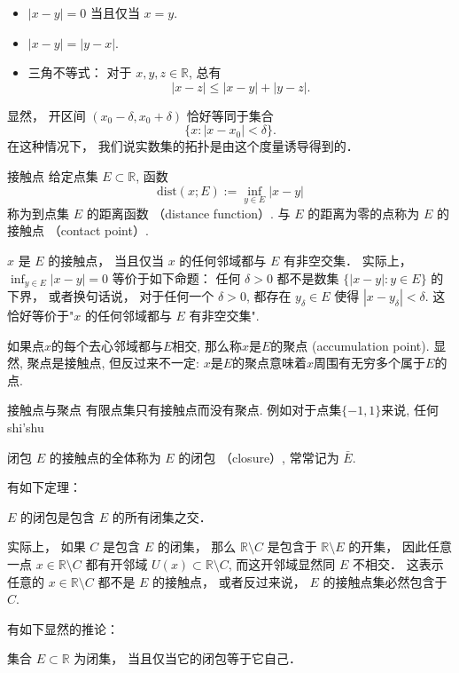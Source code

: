 \begin{itemize}
\item $|x-y|=0$ 当且仅当 $x=y$.
\item $|x-y|=|y-x|$.
\item 三角不等式： 对于 $x,y,z\in\mathbb{R}$, 总有
$$
|x-z|\leq|x-y|+|y-z|.
$$
\end{itemize}

显然， 开区间 $(x_0-\delta,x_0+\delta)$ 恰好等同于集合
$$
\{x:|x-x_0|<\delta\}.
$$
在这种情况下， 我们说实数集的拓扑是由这个度量诱导得到的．

\begin{definition}{接触点}
给定点集 $E\subset\mathbb{R}$, 函数
$$
\text{dist}(x;E):=\inf_{y\in E}|x-y|
$$
称为到点集 $E$ 的距离函数 （distance function）. 与 $E$ 的距离为零的点称为 $E$ 的接触点 （contact point）. 
\end{definition}
$x$ 是 $E$ 的接触点， 当且仅当 $x$ 的任何邻域都与 $E$ 有非空交集． 实际上， $\inf_{y\in E}|x-y|=0$ 等价于如下命题： 任何 $\delta>0$ 都不是数集 $\{|x-y|:y\in E\}$ 的下界， 或者换句话说， 对于任何一个 $\delta>0$, 都存在 $y_\delta\in E$ 使得 $|x-y_\delta|<\delta$. 这恰好等价于"$x$ 的任何邻域都与 $E$ 有非空交集".

如果点$x$的每个去心邻域都与$E$相交, 那么称$x$是$E$的聚点 (accumulation point). 显然, 聚点是接触点, 但反过来不一定: $x$是$E$的聚点意味着$x$周围有无穷多个属于$E$的点.

\begin{example}{接触点与聚点}
有限点集只有接触点而没有聚点. 例如对于点集$\{-1,1\}$来说, 任何shi'shu
\end{example}

\begin{definition}{闭包}
$E$ 的接触点的全体称为 $E$ 的闭包 （closure）, 常常记为 $\bar E$.
\end{definition}

有如下定理：

\begin{theorem}{}
$E$ 的闭包是包含 $E$ 的所有闭集之交．
\end{theorem}
实际上， 如果 $C$ 是包含 $E$ 的闭集， 那么 $\mathbb{R}\setminus C$ 是包含于 $\mathbb{R}\setminus E$ 的开集， 因此任意一点 $x\in\mathbb{R}\setminus C$ 都有开邻域 $U(x)\subset\mathbb{R}\setminus C$, 而这开邻域显然同 $E$ 不相交． 这表示任意的 $x\in\mathbb{R}\setminus C$ 都不是 $E$ 的接触点， 或者反过来说， $E$ 的接触点集必然包含于 $C$. 

有如下显然的推论：
\begin{corollary}{}
集合 $E\subset\mathbb{R}$ 为闭集， 当且仅当它的闭包等于它自己．
\end{corollary}